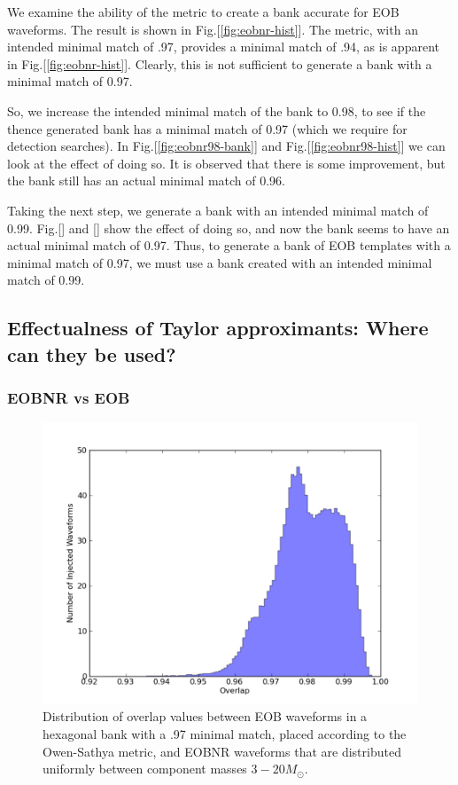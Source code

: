 \documentclass[aps,
prd,
amsmath,
amssymb,
twocolumn,
floatfix,
groupedaddress]{revtex4-1}
\begin{document}
We examine the ability of the metric to create a bank accurate for EOB waveforms. The result is shown in Fig.[\ref{fig:eobnr-hist}]. The metric, with an intended minimal match of .97, provides a minimal match of .94, as is apparent in Fig.[\ref{fig:eobnr-hist}]. Clearly, this is not sufficient to generate a bank with a minimal match of 0.97.

So, we increase the intended minimal match of the bank to 0.98, to see if the thence generated bank has a minimal match of 0.97 (which we require for detection searches). In Fig.[\ref{fig:eobnr98-bank}] and Fig.[\ref{fig:eobnr98-hist}] we can look at the effect of doing so. It is observed that there is some improvement, but the bank still has an actual minimal match of 0.96.

Taking the next step, we generate a bank with an intended minimal match of 0.99. Fig.[] and [] show the effect of doing so, and now the  bank seems to have an actual minimal match of 0.97. Thus, to generate a bank of EOB templates with a minimal match of 0.97, we must use a bank created with an intended minimal match of 0.99.

\subsection{Effectualness of Taylor approximants: Where can they be used?}

\subsubsection{EOBNR vs EOB}

\begin{figure}
\includegraphics[scale=0.04, clip=false, totalheight=0.3\textheight]{eobeobnr-hist.pdf}
\caption{\label{fig:eobeobnr-hist}Distribution of overlap values between EOB waveforms in a hexagonal bank with a .97
 minimal match, placed according to the Owen-Sathya metric, and EOBNR waveforms that are distributed uniformly between 
 component masses $3 -20 M_{\odot}$.}
\end{figure}
\end{document}
